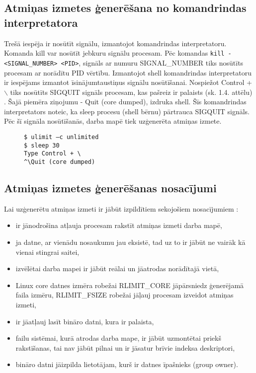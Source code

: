\subsection{Atmiņas izmetes ģenerēšana no komandrindas interpretatora}
Trešā iespēja ir nosūtīt signālu, izmantojot komandrindas interpretatoru. 
Komanda kill var nosūtīt jebkuru signālu procesam.
Pēc komandas  \texttt{kill -<SIGNAL\_NUMBER> <PID>}, signāls ar numuru  SIGNAL\_NUMBER tiks nosūtīts procesam ar norādītu PID vērtību.
Izmantojot shell komandrindas interpretatoru ir  iespējams izmantot īsinājumtaustiņus signālu nosūtīšanai. 
Nospiežot Control + $\backslash$ tiks nosūtīts SIGQUIT signāls procesam, kas pašreiz ir palaists (sk. 1.4. attēlu) \cite {nosacijumi}. 
Šajā piemēra ziņojumu - Quit (core dumped), izdruka shell. 
Šīs komandrindas interpretators noteic, ka  sleep procesu (shell bērnu) pārtrauca SIGQUIT signāls. 
Pēc šī signāla nosūtīšanās, darba mapē tiek uzģenerēta atmiņas izmete. 

\begin{figure}[h]
\begin{lstlisting}
$ ulimit –c unlimited
$ sleep 30
Type Control + \
^\Quit (core dumped)
\end{lstlisting}
\caption{\textbf{\fontsize{11}{12}\selectfont {Atmiņas izmetes ģenerēšana, izmantojot īsinājumtaustiņus}}}
\end{figure}

\subsection{Atmiņas izmetes ģenerēšanas nosacījumi}
Lai  uzģenerētu atmiņas izmeti ir jābūt izpildītiem sekojošiem nosacījumiem \cite {nosacijumi}:
\begin{itemize}
	\item   ir jānodrošina atļauja procesam rakstīt atmiņas izmeti darba mapē,
	\item 	ja datne, ar vienādu nosaukumu jau eksistē, tad uz to ir jābūt ne vairāk kā vienai stingrai saitei, 
	\item 	izvēlētai darba mapei ir jābūt reālai un jāatrodas norādītajā vietā, 
	\item 	Linux core datnes izmēra robežai {RLIMIT\_CORE} jāpārsniedz ģenerējamā faila izmēru, { RLIMIT\_FSIZE} robežai jāļauj procesam izveidot atmiņas izmeti,
	\item 	ir  jāatļauj lasīt bināro datni, kura ir palaista,
	\item 	failu sistēmai, kurā atrodas darba mape, ir jābūt uzmontētai priekš rakstīšanas, tai nav jābūt pilnai un ir jāsatur brīvie indeksa deskriptori,
	\item 	bināro datni jāizpilda lietotājam, kurš ir datnes īpašnieks (group owner).
\end{itemize} 
 
